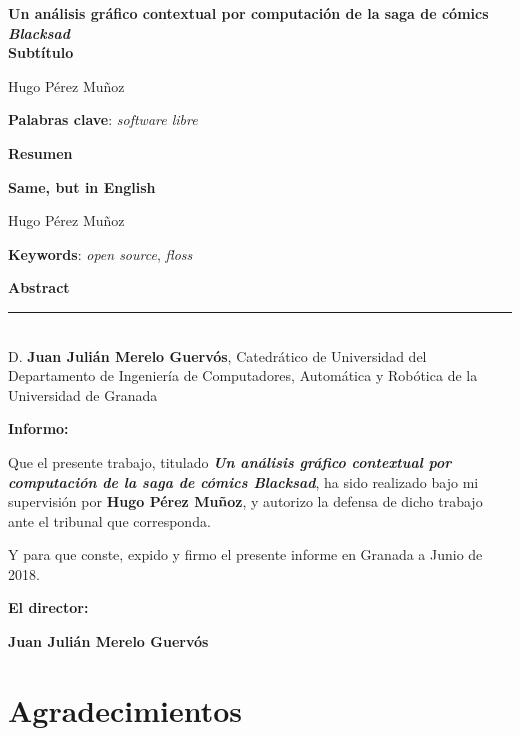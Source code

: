 \thispagestyle{empty}

\begin{center}
{\large\bfseries Un análisis gráfico contextual por computación de la saga de cómics \textit{Blacksad} \\ Subtítulo }\\
\end{center}
\begin{center}
Hugo Pérez Muñoz\\
\end{center}


\vspace{0.5cm}
\noindent\textbf{Palabras clave}: \textit{software libre}
\vspace{0.7cm}

\noindent\textbf{Resumen}\\
	

\cleardoublepage

\begin{center}
	{\large\bfseries Same, but in English}\\
\end{center}
\begin{center}
	Hugo Pérez Muñoz\\
\end{center}
\vspace{0.5cm}
\noindent\textbf{Keywords}: \textit{open source}, \textit{floss}
\vspace{0.7cm}

\noindent\textbf{Abstract}\\


\cleardoublepage

\thispagestyle{empty}

\noindent\rule[-1ex]{\textwidth}{2pt}\\[4.5ex]

D. \textbf{Juan Julián Merelo Guervós}, Catedrático de Universidad del Departamento de Ingeniería de Computadores, Automática y Robótica de la Universidad de Granada

\vspace{0.5cm}

\textbf{Informo:}

\vspace{0.5cm}

Que el presente trabajo, titulado \textit{\textbf{Un análisis gráfico contextual por computación de la saga de cómics \textup{Blacksad}}},
ha sido realizado bajo mi supervisión por \textbf{Hugo Pérez Muñoz}, y autorizo la defensa de dicho trabajo ante el tribunal
que corresponda.

\vspace{0.5cm}

Y para que conste, expido y firmo el presente informe en Granada a Junio de 2018.

\vspace{1cm}

\textbf{El director: }

\vspace{5cm}

\noindent \textbf{Juan Julián Merelo Guervós}

\chapter*{Agradecimientos}




